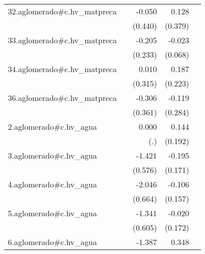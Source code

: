 {\begin{longtable}{l*{4}{D{.}{.}{-1}}}
\addlinespace
32.aglomerado#c.hv\_matpreca&                     &      -0.050         &       0.128         &                     \\
            &                     &     (0.440)         &     (0.379)         &                     \\
\addlinespace
33.aglomerado#c.hv\_matpreca&                     &      -0.205         &      -0.023         &                     \\
            &                     &     (0.233)         &     (0.068)         &                     \\
\addlinespace
34.aglomerado#c.hv\_matpreca&                     &       0.010         &       0.187         &                     \\
            &                     &     (0.315)         &     (0.223)         &                     \\
\addlinespace
36.aglomerado#c.hv\_matpreca&                     &      -0.306         &      -0.119         &                     \\
            &                     &     (0.361)         &     (0.284)         &                     \\
\addlinespace
2.aglomerado#c.hv\_agua&                     &       0.000         &       0.144         &                     \\
            &                     &         (.)         &     (0.192)         &                     \\
\addlinespace
3.aglomerado#c.hv\_agua&                     &      -1.421\sym{*}  &      -0.195         &                     \\
            &                     &     (0.576)         &     (0.171)         &                     \\
\addlinespace
4.aglomerado#c.hv\_agua&                     &      -2.046\sym{**} &      -0.106         &                     \\
            &                     &     (0.664)         &     (0.157)         &                     \\
\addlinespace
5.aglomerado#c.hv\_agua&                     &      -1.341\sym{*}  &      -0.020         &                     \\
            &                     &     (0.605)         &     (0.172)         &                     \\
\addlinespace
6.aglomerado#c.hv\_agua&                     &      -1.387\sym{*}  &       0.348         &                     \\

\end{longtable}}
